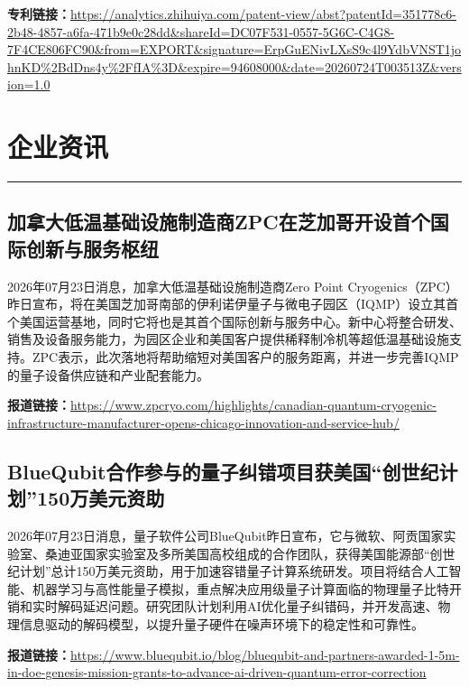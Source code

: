 \documentclass[12pt,a4paper]{ctexart}
\begin{document}
\noindent\textbf{专利链接：}\url{https://analytics.zhihuiya.com/patent-view/abst?patentId=351778c6-2b48-4857-a6fa-471b9e0c28dd&shareId=DC07F531-0557-5G6C-C4G8-7F4CE806FC90&from=EXPORT&signature=ErpGuENivLXsS9c4l9YdbVNST1johnKD%2BdDns4y%2FfIA%3D&expire=94608000&date=20260724T003513Z&version=1.0}




\newpage
\section{企业资讯}
\vspace{-0.5em}
\noindent\rule{\linewidth}{1.5pt}

\subsection{ 加拿大低温基础设施制造商ZPC在芝加哥开设首个国际创新与服务枢纽 }

2026年07月23日消息，加拿大低温基础设施制造商Zero Point Cryogenics（ZPC）昨日宣布，将在美国芝加哥南部的伊利诺伊量子与微电子园区（IQMP）设立其首个美国运营基地，同时它将也是其首个国际创新与服务中心。新中心将整合研发、销售及设备服务能力，为园区企业和美国客户提供稀释制冷机等超低温基础设施支持。ZPC表示，此次落地将帮助缩短对美国客户的服务距离，并进一步完善IQMP的量子设备供应链和产业配套能力。

\noindent\textbf{报道链接：}\url{https://www.zpcryo.com/highlights/canadian-quantum-cryogenic-infrastructure-manufacturer-opens-chicago-innovation-and-service-hub/}

\subsection{ BlueQubit合作参与的量子纠错项目获美国“创世纪计划”150万美元资助 }

2026年07月23日消息，量子软件公司BlueQubit昨日宣布，它与微软、阿贡国家实验室、桑迪亚国家实验室及多所美国高校组成的合作团队，获得美国能源部“创世纪计划”总计150万美元资助，用于加速容错量子计算系统研发。项目将结合人工智能、机器学习与高性能量子模拟，重点解决应用级量子计算面临的物理量子比特开销和实时解码延迟问题。研究团队计划利用AI优化量子纠错码，并开发高速、物理信息驱动的解码模型，以提升量子硬件在噪声环境下的稳定性和可靠性。

\noindent\textbf{报道链接：}\url{https://www.bluequbit.io/blog/bluequbit-and-partners-awarded-1-5m-in-doe-genesis-mission-grants-to-advance-ai-driven-quantum-error-correction}
\end{document}
